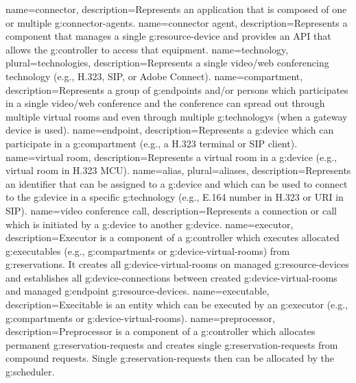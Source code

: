 {
  name=connector,
  description={Represents an application that is composed of one or multiple \glspl{g:connector-agent}.}
}
{
  name=connector agent,
  description={Represents a component that manages a single \gls{g:resource-device} 
    and provides an API that allows the \gls{g:controller} to access that equipment.}
}
{
  name=technology,
  plural=technologies,
  description={Represents a single video/web conferencing technology (e.g., 
    H.323, SIP, or Adobe Connect).}
}
{
  name=compartment,
  description={Represents a group of \glspl{g:endpoint} and/or persons which participates 
    in a single video/web conference and the conference can spread out through multiple 
    virtual rooms and even through multiple \glspl{g:technology} (when a gateway device is used).}
}
{
  name=endpoint,
  description={Represents a \gls{g:device} which can participate in a \gls{g:compartment} (e.g., a H.323 terminal or SIP client).}
}
{
  name=virtual room,
  description={Represents a virtual room in a \gls{g:device} (e.g., virtual room in H.323 MCU).}
}
{
  name=alias,
  plural=aliases,
  description={Represents an identifier that can be assigned to a \gls{g:device} and
    which can be used to connect to the \gls{g:device} in a specific \gls{g:technology} 
    (e.g., E.164 number in H.323 or URI in SIP).}
}
{
  name=video conference call,
  description={Represents a connection or call which is initiated by a 
    \gls{g:device} to another \gls{g:device}.}
}
{
  name=executor,
  description={Executor is a component of a \gls{g:controller} which executes
    allocated \glspl{g:executable} (e.g., \glspl{g:compartment} or \glspl{g:device-virtual-room})
    from \glspl{g:reservation}. It creates all \glspl{g:device-virtual-room} on managed 
    \glspl{g:resource-device} and establishes all \glspl{g:device-connection} between created 
    \glspl{g:device-virtual-room} and managed \gls{g:endpoint} 
    \glspl{g:resource-device}.}
}
{
  name=executable,
  description={Execitable is an entity which can be executed by an \gls{g:executor} (e.g., \glspl{g:compartment} or \glspl{g:device-virtual-room}).}
}
{
  name=preprocessor,
  description={Preprocessor is a component of a \gls{g:controller} which allocates
    permanent \glspl{g:reservation-request} and creates single \glspl{g:reservation-request} 
    from compound requests. Single \glspl{g:reservation-request} then can be allocated 
    by the \gls{g:scheduler}.}
}



